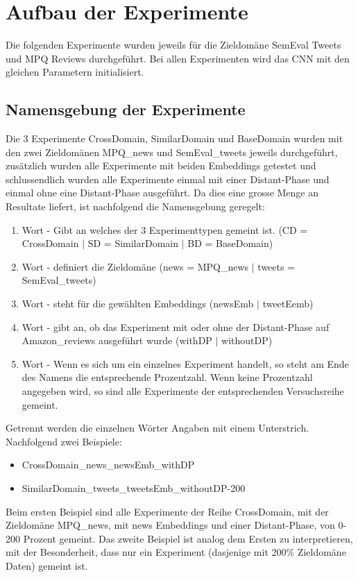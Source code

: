 \section{Aufbau der Experimente}
\label{experiments}
Die folgenden Experimente wurden jeweils für die Zieldomäne SemEval Tweets und MPQ Reviews durchgeführt. Bei allen Experimenten wird das CNN mit den gleichen Parametern initialisiert.
\subsection{Namensgebung der Experimente}
Die 3 Experimente CrossDomain, SimilarDomain und BaseDomain wurden mit den zwei Zieldomänen MPQ\_news und SemEval\_tweets jeweils durchgeführt, zusätzlich wurden alle Experimente mit beiden Embeddings getestet und schlussendlich wurden alle Experimente einmal mit einer Distant-Phase und einmal ohne eine Distant-Phase ausgeführt. Da dies eine grosse Menge an Resultate liefert, ist nachfolgend die Namensgebung geregelt:

\begin{enumerate}  
	\item Wort - Gibt an welches der 3 Experimenttypen gemeint ist. (CD = CrossDomain $\vert$ SD = SimilarDomain $\vert$ BD = BaseDomain)
	\item Wort - definiert die Zieldomäne (news = MPQ\_news $\vert$ tweets = SemEval\_tweets)
	\item Wort - steht für die gewählten Embeddings (newsEmb $\vert$ tweetEemb)
	\item Wort - gibt an, ob das Experiment mit oder ohne der Distant-Phase auf Amazon\_reviews ausgeführt wurde (withDP $\vert$ withoutDP)
	\item Wort - Wenn es sich um  ein einzelnes Experiment handelt, so steht am Ende des Namens die entsprechende Prozentzahl. Wenn keine Prozentzahl angegeben wird, so sind alle Experimente der entsprechenden Versuchsreihe gemeint.
\end{enumerate}
Getrennt werden die einzelnen Wörter Angaben mit einem Unterstrich. Nachfolgend zwei Beispiele:
\begin{itemize}  
	\item CrossDomain\_news\_newsEmb\_withDP
	\item SimilarDomain\_tweets\_tweetsEmb\_withoutDP-200
\end{itemize}
Beim ersten Beispiel sind alle Experimente der Reihe CrossDomain, mit der Zieldomäne MPQ\_news, mit news Embeddings und einer Distant-Phase, von 0-200 Prozent gemeint. Das zweite Beispiel ist analog dem Ersten zu interpretieren, mit der Besonderheit, dass nur ein Experiment (dasjenige mit 200$\%$ Zieldomäne Daten) gemeint ist.
